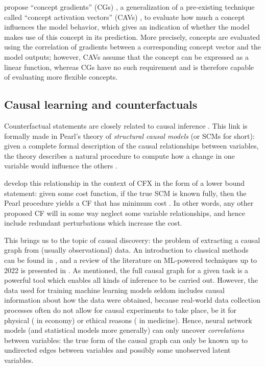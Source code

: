 \documentclass[../main.tex]{subfiles}
\begin{document}
\citeauthor{baiConcept2022} propose ``concept gradients'' (CGs) \cite{baiConcept2022}, a generalization of a pre-existing technique called ``concept activation vectors'' (CAVs) \cite{kimInterpretability2018}, to evaluate how much a concept influences the model behavior, which gives an indication of whether the model makes use of this concept in its prediction.
More precisely, concepts are evaluated using the correlation of gradients between a corresponding concept vector and the model outputs; however, CAVs assume that the concept can be expressed as a linear function, whereas CGs have no such requirement and is therefore capable of evaluating more flexible concepts.

\subsection{Causal learning and counterfactuals}

Counterfactual statements are closely related to causal inference \cite{morganCounterfactuals2015}.
This link is formally made in Pearl's theory of \emph{structural causal models} (or SCMs for short): given a complete formal description of the causal relationships between variables, the theory describes a natural procedure to compute how a change in one variable would influence the others \cite{pearlCausal2016}.

\citeauthor{karimiAlgorithmic2020} develop this relationship in the context of CFX in the form of a lower bound statement: given some cost function, if the true SCM is known fully, then the Pearl procedure yields a CF that has minimum cost \cite{karimiAlgorithmic2020}.
In other words, any other proposed CF will in some way neglect some variable relationships, and hence include redundant perturbations which increase the cost.

This brings us to the topic of causal discovery: the problem of extracting a causal graph from (usually observational) data.
An introduction to classical methods can be found in \cite{cunninghamCausal2021}, and a review of the literature on ML-powered techniques up to 2022 is presented in \cite{vowelsYa2023}.
As mentioned, the full causal graph for a given task is a powerful tool which enables all kinds of inference to be carried out.
However, the data used for training machine learning models seldom includes causal information about how the data were obtained, because real-world data collection processes often do not allow for causal experiments to take place, be it for physical (\eg{} in economy) or ethical reasons (\eg{} in medicine).
Hence, neural network models (and statistical models more generally) can only uncover \emph{correlations} between variables: the true form of the causal graph can only be known up to undirected edges between variables and possibly some unobserved latent variables.
\end{document}
